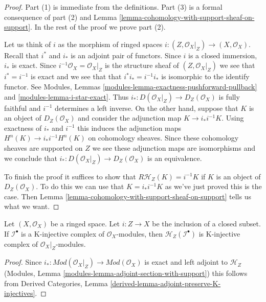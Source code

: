 \begin{proof}
Part (1) is immediate from the definitions. Part (3) is a formal
consequence of part (2) and
Lemma \ref{lemma-cohomology-with-support-sheaf-on-support}.
In the rest of the proof we prove part (2).

\medskip\noindent
Let us think of $i$ as the morphism of ringed spaces
$i : (Z, \mathcal{O}_X|_Z) \to (X, \mathcal{O}_X)$.
Recall that $i^*$ and $i_*$ is an adjoint pair of functors.
Since $i$ is a closed immersion, $i_*$ is exact.
Since $i^{-1}\mathcal{O}_X = \mathcal{O}_X|_Z$ is the structure
sheaf of $(Z, \mathcal{O}_X|_Z)$ we see that $i^* = i^{-1}$
is exact and we see that that $i^*i_* = i^{-1}i_*$
is isomorphic to the identify functor. See
Modules, Lemmas \ref{modules-lemma-exactness-pushforward-pullback} and
\ref{modules-lemma-i-star-exact}. Thus
$i_* : D(\mathcal{O}_X|_Z) \to D_Z(\mathcal{O}_X)$
is fully faithful and $i^{-1}$ determines
a left inverse. On the other hand, suppose that $K$ is an object of
$D_Z(\mathcal{O}_X)$ and consider the adjunction map
$K \to i_*i^{-1}K$.
Using exactness of $i_*$ and $i^{-1}$ this induces the adjunction maps
$H^n(K) \to i_*i^{-1}H^n(K)$ on cohomology sheaves. Since these cohomology
sheaves are supported on $Z$ we see these adjunction maps are isomorphisms
and we conclude that $i_* : D(\mathcal{O}_X|_Z) \to D_Z(\mathcal{O}_X)$
is an equivalence.

\medskip\noindent
To finish the proof it suffices to show that $R\mathcal{H}_Z(K) = i^{-1}K$ if
$K$ is an object of $D_Z(\mathcal{O}_X)$. To do this we can use that
$K = i_*i^{-1}K$ as we've just proved this is the case. Then
Lemma \ref{lemma-cohomology-with-support-sheaf-on-support}
tells us what we want.
\end{proof}

\begin{lemma}
\label{lemma-sections-with-support-K-injective}
Let $(X, \mathcal{O}_X)$ be a ringed space. Let $i : Z \to X$
be the inclusion of a closed subset. If $\mathcal{I}^\bullet$ is a K-injective
complex of $\mathcal{O}_X$-modules, then
$\mathcal{H}_Z(\mathcal{I}^\bullet)$ is K-injective complex of
$\mathcal{O}_X|_Z$-modules.
\end{lemma}

\begin{proof}
Since $i_* : \textit{Mod}(\mathcal{O}_X|_Z) \to \textit{Mod}(\mathcal{O}_X)$
is exact and left adjoint to $\mathcal{H}_Z$
(Modules, Lemma \ref{modules-lemma-adjoint-section-with-support})
this follows from
Derived Categories, Lemma \ref{derived-lemma-adjoint-preserve-K-injectives}.
\end{proof}


